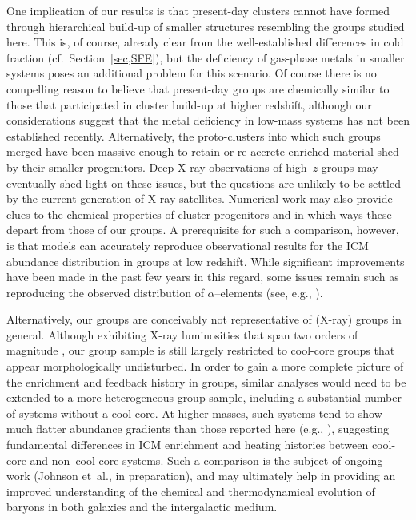\documentclass[useAMS,usenatbib]{mn2e}
\begin{document}
One implication of our results is that present-day clusters cannot
have formed through hierarchical build-up of smaller structures
resembling the groups studied here. This is, of course, already clear
from the well-established differences in cold fraction (cf.\
Section~\ref{sec,SFE}), but the deficiency of gas-phase metals in
smaller systems poses an additional problem for this scenario.  Of
course there is no compelling reason to believe that present-day
groups are chemically similar to those that participated in cluster
build-up at higher redshift, although our considerations suggest that
the metal deficiency in low-mass systems has not been established
recently. Alternatively, the proto-clusters into which such groups
merged have been massive enough to retain or re-accrete enriched
material shed by their smaller progenitors.  Deep X-ray observations
of high--$z$ groups may eventually shed light on these issues, but the
questions are unlikely to be settled by the current generation of
X-ray satellites.  Numerical work may also provide clues to the
chemical properties of cluster progenitors and in which ways these
depart from those of our groups.  A prerequisite for such a
comparison, however, is that models can accurately reproduce
observational results for the ICM abundance distribution in groups at
low redshift.  While significant improvements have been made in the
past few years in this regard, some issues remain such as reproducing
the observed distribution of $\alpha$--elements (see, e.g.,
\citealt{dave08}).

Alternatively, our groups are conceivably not representative of
(X-ray) groups in general. Although exhibiting X-ray luminosities that
span two orders of magnitude \citep{osmo04}, our group sample is still
largely restricted to cool-core groups that appear morphologically
undisturbed. In order to gain a more complete picture of the
enrichment and feedback history in groups, similar analyses would need
to be extended to a more heterogeneous group sample, including a
substantial number of systems without a cool core. At higher masses,
such systems tend to show much flatter abundance gradients than those
reported here (e.g., \citealt{degr04}), suggesting fundamental
differences in ICM enrichment and heating histories between cool-core
and non--cool core systems. Such a comparison is the subject of
ongoing work (Johnson et~al., in preparation), and may ultimately help
in providing an improved understanding of the chemical and
thermodynamical evolution of baryons in both galaxies and the
intergalactic medium.
\end{document}
